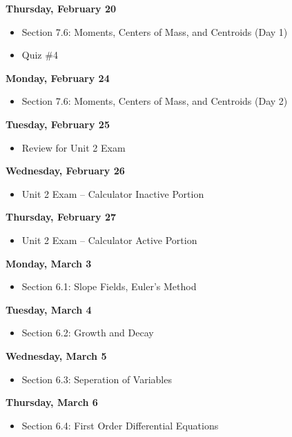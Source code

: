 \documentclass[11pt]{article}
\begin{document}
\textbf{Thursday, February 20}

\begin{itemize}
\item Section 7.6: Moments, Centers of Mass, and Centroids (Day 1)
\item Quiz \#4
\end{itemize}

\textbf{Monday, February 24}

\begin{itemize}
\item Section 7.6: Moments, Centers of Mass, and Centroids (Day 2)
\end{itemize}

\textbf{Tuesday, February 25}

\begin{itemize}
\item Review for Unit 2 Exam
\end{itemize}

\textbf{Wednesday, February 26}

\begin{itemize}
\item Unit 2 Exam -- Calculator Inactive Portion
\end{itemize}

\textbf{Thursday, February 27}

\begin{itemize}
\item Unit 2 Exam -- Calculator Active Portion
\end{itemize}

\textbf{Monday, March 3}

\begin{itemize}
\item Section 6.1: Slope Fields, Euler's Method
\end{itemize}

\textbf{Tuesday, March 4}

\begin{itemize}
\item Section 6.2: Growth and Decay
\end{itemize}

\textbf{Wednesday, March 5}

\begin{itemize}
\item Section 6.3: Seperation of Variables
\end{itemize}

\textbf{Thursday, March 6}

\begin{itemize}
\item Section 6.4: First Order Differential Equations
\end{itemize}
\end{document}
